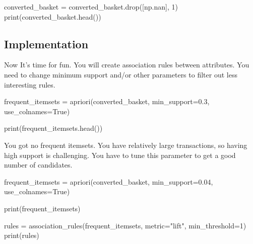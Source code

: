 \documentclass[
  letterpaper,
]{scrbook}
\newenvironment{Shaded}{\begin{snugshade}}{\end{snugshade}}
\newcommand{\BuiltInTok}[1]{\textcolor[rgb]{0.00,0.23,0.31}{#1}}
\newcommand{\DecValTok}[1]{\textcolor[rgb]{0.68,0.00,0.00}{#1}}
\newcommand{\FloatTok}[1]{\textcolor[rgb]{0.68,0.00,0.00}{#1}}
\newcommand{\NormalTok}[1]{\textcolor[rgb]{0.00,0.23,0.31}{#1}}
\newcommand{\OperatorTok}[1]{\textcolor[rgb]{0.37,0.37,0.37}{#1}}
\newcommand{\StringTok}[1]{\textcolor[rgb]{0.13,0.47,0.30}{#1}}
\newcommand{\VariableTok}[1]{\textcolor[rgb]{0.07,0.07,0.07}{#1}}
\begin{document}
\begin{Shaded}
\begin{Highlighting}[]
\NormalTok{converted\_basket }\OperatorTok{=}\NormalTok{ converted\_basket.drop([np.nan], }\DecValTok{1}\NormalTok{)  }
\BuiltInTok{print}\NormalTok{(converted\_basket.head())}
\end{Highlighting}
\end{Shaded}

\subsection*{Implementation}\label{implementation}

Now It's time for fun. You will create association rules between
attributes. You need to change minimum support and/or other parameters
to filter out less interesting rules.

\begin{Shaded}
\begin{Highlighting}[]
\NormalTok{frequent\_itemsets }\OperatorTok{=}\NormalTok{ apriori(converted\_basket, min\_support}\OperatorTok{=}\FloatTok{0.3}\NormalTok{, use\_colnames}\OperatorTok{=}\VariableTok{True}\NormalTok{)}

\BuiltInTok{print}\NormalTok{(frequent\_itemsets.head())}
\end{Highlighting}
\end{Shaded}

You got no frequent itemsets. You have relatively large transactions, so
having high support is challenging. You have to tune this parameter to
get a good number of candidates.

\begin{Shaded}
\begin{Highlighting}[]
\NormalTok{frequent\_itemsets }\OperatorTok{=}\NormalTok{ apriori(converted\_basket, min\_support}\OperatorTok{=}\FloatTok{0.04}\NormalTok{, use\_colnames}\OperatorTok{=}\VariableTok{True}\NormalTok{)}

\BuiltInTok{print}\NormalTok{(frequent\_itemsets)}
\end{Highlighting}
\end{Shaded}

\begin{Shaded}
\begin{Highlighting}[]
\NormalTok{rules }\OperatorTok{=}\NormalTok{ association\_rules(frequent\_itemsets, metric}\OperatorTok{=}\StringTok{"lift"}\NormalTok{, min\_threshold}\OperatorTok{=}\DecValTok{1}\NormalTok{)}
\BuiltInTok{print}\NormalTok{(rules)}
\end{Highlighting}
\end{Shaded}
\end{document}

